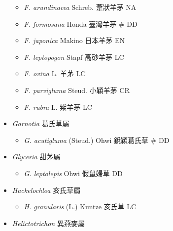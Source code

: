 \begin{itemize}
  \begin{itemize}
        \item[] \textit{F. arundinacea} Schreb.  葦狀羊茅   NA
        \item[] \textit{F. formosana} Honda  臺灣羊茅  \# DD
        \item[] \textit{F. japonica} Makino  日本羊茅   EN
        \item[] \textit{F. leptopogon} Stapf  高砂羊茅   LC
        \item[] \textit{F. ovina} L.  羊茅   LC
        \item[] \textit{F. parvigluma} Steud.  小穎羊茅   CR
        \item[] \textit{F. rubra} L.  紫羊茅   LC
  \end{itemize}
 \item[] \textit{Garnotia} 葛氏草屬
                                
  \begin{itemize}
        \item[] \textit{G. acutigluma} (Steud.) Ohwi  銳穎葛氏草  \# DD
  \end{itemize}
 \item[] \textit{Glyceria} 甜茅屬
                                
  \begin{itemize}
        \item[] \textit{G. leptolepis} Ohwi  假鼠婦草   DD
  \end{itemize}
 \item[] \textit{Hackelochloa} 亥氏草屬
                                
  \begin{itemize}
        \item[] \textit{H. granularis} (L.) Kuntze  亥氏草   LC
  \end{itemize}
 \item[] \textit{Helictotrichon} 異燕麥屬
                                

\end{itemize}

